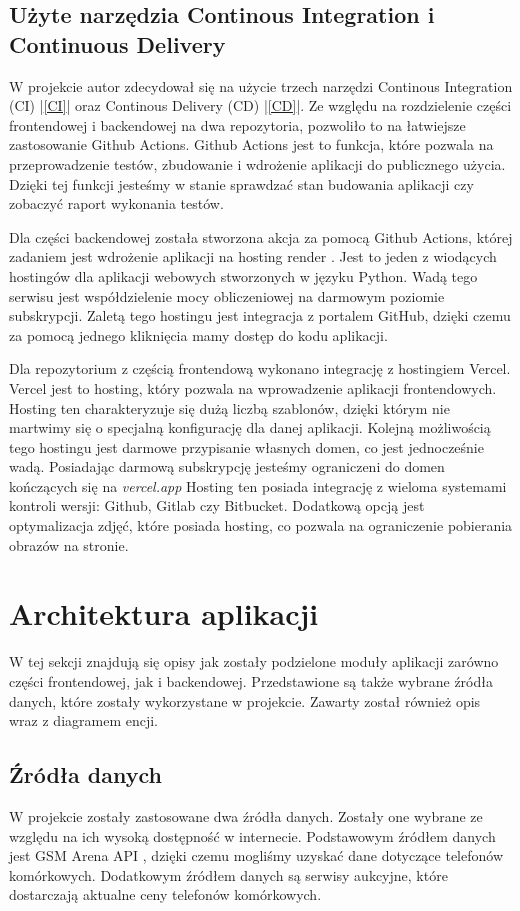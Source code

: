 \subsection{Użyte narzędzia Continous Integration i Continuous Delivery}
W projekcie autor zdecydował się na użycie trzech narzędzi Continous Integration (CI) |\ref{CI}| oraz Continous Delivery (CD) |\ref{CD}|. Ze względu na rozdzielenie części frontendowej i backendowej na dwa repozytoria, pozwoliło to na łatwiejsze zastosowanie Github Actions. Github Actions \cite{github_actions} jest to funkcja, które pozwala na przeprowadzenie testów, zbudowanie i wdrożenie aplikacji do publicznego użycia. Dzięki tej funkcji jesteśmy w stanie sprawdzać stan budowania aplikacji czy zobaczyć raport wykonania testów.

Dla części backendowej została stworzona akcja za pomocą Github Actions, której zadaniem jest wdrożenie aplikacji na hosting render \cite{render}. Jest to jeden z wiodących hostingów \cite{render_top} dla aplikacji webowych stworzonych w języku Python. Wadą tego serwisu jest współdzielenie mocy obliczeniowej na darmowym poziomie subskrypcji. Zaletą tego hostingu jest integracja z portalem GitHub, dzięki czemu za pomocą jednego kliknięcia mamy dostęp do kodu aplikacji.

Dla repozytorium z częścią frontendową wykonano integrację z hostingiem Vercel. Vercel \cite{vercel} jest to hosting, który pozwala na wprowadzenie aplikacji frontendowych. Hosting ten charakteryzuje się dużą liczbą szablonów, dzięki którym nie martwimy się o specjalną konfigurację dla danej aplikacji. Kolejną możliwością tego hostingu jest darmowe przypisanie własnych domen, co jest jednocześnie wadą. Posiadając darmową subskrypcję jesteśmy ograniczeni do domen kończących się na \textit{vercel.app} Hosting ten posiada integrację z wieloma systemami kontroli wersji: Github, Gitlab czy Bitbucket. Dodatkową opcją jest optymalizacja zdjęć, które posiada hosting, co pozwala na ograniczenie pobierania obrazów na stronie.

\section{Architektura aplikacji}
W tej sekcji znajdują się opisy jak zostały podzielone moduły aplikacji zarówno części frontendowej, jak i backendowej. Przedstawione są także wybrane źródła danych, które zostały wykorzystane w projekcie. Zawarty został również opis wraz z diagramem encji.

\subsection{Źródła danych}\label{data_sources}
W projekcie zostały zastosowane dwa źródła danych. Zostały one wybrane ze względu na ich wysoką dostępność w internecie.
Podstawowym źródłem danych jest \linebreak GSM Arena API \cite{gsm_arena_api}, dzięki czemu mogliśmy uzyskać dane dotyczące telefonów komórkowych. Dodatkowym źródłem danych są serwisy aukcyjne, które dostarczają aktualne ceny telefonów komórkowych.

